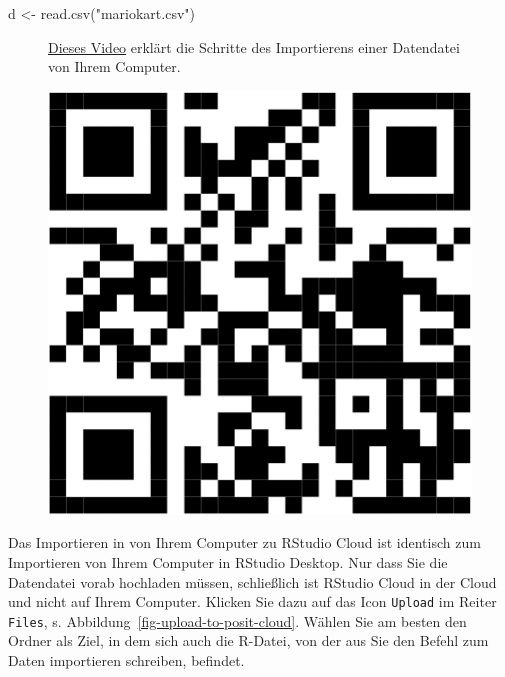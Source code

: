 \documentclass[
  letterpaper,
  twoside,
  open=any]{scrbook}
\newenvironment{Shaded}{\begin{snugshade}}{\end{snugshade}}
\newcommand{\FunctionTok}[1]{\textcolor[rgb]{0.28,0.35,0.67}{#1}}
\newcommand{\NormalTok}[1]{\textcolor[rgb]{0.00,0.23,0.31}{#1}}
\newcommand{\OtherTok}[1]{\textcolor[rgb]{0.00,0.23,0.31}{#1}}
\newcommand{\StringTok}[1]{\textcolor[rgb]{0.13,0.47,0.30}{#1}}
\theoremstyle{definition}
\theoremstyle{definition}
\theoremstyle{definition}
\theoremstyle{remark}
\begin{document}
\begin{Shaded}
\begin{Highlighting}[]
\NormalTok{d }\OtherTok{\textless{}{-}} \FunctionTok{read.csv}\NormalTok{(}\StringTok{"mariokart.csv"}\NormalTok{)}
\end{Highlighting}
\end{Shaded}

\begin{figure}

\begin{minipage}{0.80\linewidth}
\href{https://youtu.be/B_nuN-M0pQM}{Dieses Video} erklärt die Schritte
des Importierens einer Datendatei von Ihrem Computer.\end{minipage}%
%
\begin{minipage}{0.20\linewidth}

\begin{center}
\includegraphics[width=0.75\linewidth,height=\textheight,keepaspectratio]{020-R_files/figure-pdf/unnamed-chunk-30-1.pdf}
\end{center}

\end{minipage}%

\end{figure}%

Das Importieren in von Ihrem Computer zu RStudio Cloud ist identisch zum
Importieren von Ihrem Computer in RStudio Desktop. Nur dass Sie die
Datendatei vorab hochladen müssen, schließlich ist RStudio Cloud in der
Cloud und nicht auf Ihrem Computer. Klicken Sie dazu auf das Icon
\texttt{Upload} im Reiter \texttt{Files}, s.
Abbildung~\ref{fig-upload-to-posit-cloud}. Wählen Sie am besten den
Ordner als Ziel, in dem sich auch die R-Datei, von der aus Sie den
Befehl zum Daten importieren schreiben, befindet.
\end{document}
